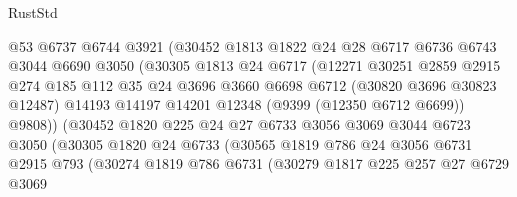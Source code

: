 \begin{lexlean}{RustStd}
\begin{coremodule}
                        @53
                        @6737
                        @6744
                        @3921
                        (@30452
                          @1813
                          @1822
                          @24
                          @28
                          @6717
                          @6736
                          @6743
                          @3044
                          @6690
                          @3050
                          (@30305
                            @1813
                            @24
                            @6717
                            (@12271
                              @30251
                              @2859
                              @2915
                              @274
                              @185
                              @112
                              @35
                              @24
                              @3696
                              @3660
                              @6698
                              @6712
                              (@30820 @3696 @30823 @12487)
                              @14193
                              @14197
                              @14201
                              @12348
                              (@9399 (@12350 @6712 @6699))
                              @9808))
                          (@30452
                            @1820
                            @225
                            @24
                            @27
                            @6733
                            @3056
                            @3069
                            @3044
                            @6723
                            @3050
                            (@30305
                              @1820
                              @24
                              @6733
                              (@30565
                                @1819
                                @786
                                @24
                                @3056
                                @6731
                                @2915
                                @793
                                (@30274
                                  @1819
                                  @786
                                  @6731
                                  (@30279
                                    @1817
                                    @225
                                    @257
                                    @27
                                    @6729
                                    @3069

\end{coremodule}
\end{lexlean}
